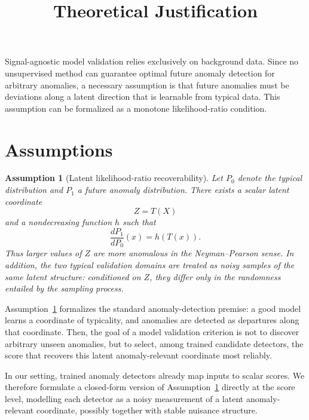 \documentclass[11pt]{article}
\title{Theoretical Justification}
\author{}
\date{}
\newtheorem{assumption}{Assumption}
\begin{document}
\maketitle

Signal-agnostic model validation relies exclusively on background data. Since no unsupervised method can guarantee optimal future anomaly detection for arbitrary anomalies, a necessary assumption is that future anomalies must be deviations along a latent direction that is learnable from typical data. This assumption can be formalized as a monotone likelihood-ratio condition.

\section{Assumptions}

\begin{assumption}[Latent likelihood-ratio recoverability]
\label{ass:lrr}
Let \(P_0\) denote the typical distribution and \(P_1\) a future anomaly distribution. There exists a scalar latent coordinate
\[
    Z=T(X)
\]
and a nondecreasing function \(h\) such that
\[
    \frac{dP_1}{dP_0}(x)=h(T(x)).
\]
Thus larger values of \(Z\) are more anomalous in the Neyman--Pearson sense. In addition, the two typical validation domains are treated as noisy samples of the same latent structure: conditioned on \(Z\), they differ only in the randomness entailed by the sampling process.
\end{assumption}

Assumption~\ref{ass:lrr} formalizes the standard anomaly-detection premise: a good model learns a coordinate of typicality, and anomalies are detected as departures along that coordinate. Then, the goal of a model validation criterion is not to discover arbitrary unseen anomalies, but to select, among trained candidate detectors, the score that recovers this latent anomaly-relevant coordinate most reliably.

In our setting, trained anomaly detectors already map inputs to scalar scores.
We therefore formulate a closed-form version of Assumption~\ref{ass:lrr}
directly at the score level, modelling each detector as a noisy measurement of
a latent anomaly-relevant coordinate, possibly together with stable nuisance
structure.
\end{document}

